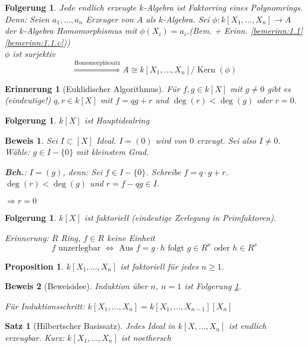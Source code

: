 \documentclass[a4paper, 12pt, numbers=noendperiod, chapterprefix=true]{scrbook}
\theoremstyle{break}
\newtheorem{Satz}{Satz}
\newtheorem{Erinn}[Def]{Erinnerung}
\newtheorem{Prop}[Def]{Proposition}
\newtheorem{Folg}[Def]{Folgerung}
\theoremstyle{nonumberbreak}
\newtheorem{Bew}{Beweis}
\theoremstyle{nonumberplain}
\DeclareMathOperator{\Kern}{Kern}
\begin{document}
\begin{Folg}\label{folg1.2}
Jede endlich erzeugte $k$-Algebra ist Faktorring eines Polynomrings.\\
	\emph{Denn:} Seien $a_1,\dots, a_n$ Erzeuger von $A$ als $k$-Algebra. Sei $\phi:k[X_1,\dots,X_n] \to A$ \emph{der} $k$-Algebra Homomorphismus mit $\phi(X_i) = a_i$.(Bem. + Erinn. \ref{bemerinn:1.1} \ref{bemerinn:1.1.c}))\\
	$\phi$ ist surjektiv \[\overset{\textrm{Homomorphiesatz}}{\Longrightarrow} A \cong k[X_1,\dots, X_n]/\Kern(\phi)\]
\end{Folg}

\begin{Erinn}[Euklidischer Algorithmus]
F\"ur $f,g\in k[X]$ mit $g\not= 0$ gibt es (eindeutige!) $q,r \in k[X]$ mit $f=qg+r$ und $\deg(r) < \deg(g)$ oder $r=0$.
\end{Erinn}

\begin{Folg}
$k[X]$ ist Hauptidealring
\end{Folg}

\begin{Bew}
Sei $I \subset[X]$ Ideal. $I = (0)$ wird von $0$ erzeugt. Sei also $I\not=0$. W\"ahle: $g \in I-\{0\}$ mit kleinstem Grad.

\textbf{Beh.}: $I = (g)$, \emph{denn:} Sei $f\in I-\{0\}$. Schreibe $f=q\cdot g+r$. $\deg(r)<\deg(g)$ und $r=f-qg \in I$.

$\Rightarrow r=0$
\end{Bew}

\begin{Folg}\label{folg:1.5}
$k[X]$ ist faktoriell (eindeutige Zerlegung in Primfaktoren).

\emph{Erinnerung}: $R$ Ring, $f \in R$ keine Einheit
	\[f \textrm{ unzerlegbar } \Leftrightarrow \textrm{ Aus } f = g\cdot h \textrm{ folgt } g \in R^x \textrm{ oder } h\in R^x\]
\end{Folg}

\begin{Prop}
$k[X_1, \dots, X_n]$ ist faktoriell f\"ur jedes $n\ge 1$.
\end{Prop}

\begin{Bew}[Beweisidee]
Induktion \"uber $n$, $n = 1$ ist Folgerung \ref{folg:1.5}.

F\"ur Induktionsschritt: $k[X_1,\dots, X_n] = k[X_1,\dots,X_{n-1}][X_n]$
\end{Bew}

\begin{Satz}[Hilbertscher Basissatz]\label{satz1}
Jedes Ideal in $k[X,\dots ,X_n]$ ist endlich erzeugbar. \emph{Kurz:} $k[X_1,\dots, X_n]$ ist noethersch
\end{Satz}
\end{document}
